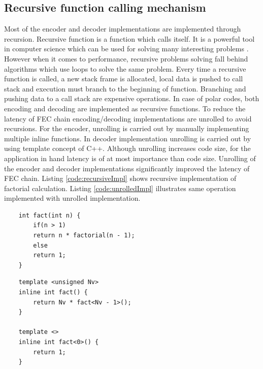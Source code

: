 \subsection{Recursive function calling mechanism}
Most of the encoder and decoder implementations are implemented through recursion. Recursive function is a function which calls itself. It is a powerful tool in computer science which can be used for solving many interesting problems \cite{CLRS}. However when it comes to performance, recursive problems solving fall behind algorithms which use loops to solve the same problem. Every time a recursive function is called, a new stack frame is allocated, local data is pushed to call stack and execution must branch to the beginning of function. Branching and pushing data to a call stack are expensive operations. In case of polar codes, both encoding and decoding are implemented as recursive functions. To reduce the latency of FEC chain encoding/decoding implementations are unrolled to avoid recursions. For the encoder, unrolling is carried out by manually implementing multiple inline functions. In decoder implementation unrolling is carried out by using template concept of C++. Although unrolling increases code size, for the application in hand latency is of at most importance than code size. Unrolling of the encoder and decoder implementations significantly improved the latency of FEC chain. Listing \ref{code:recursiveImpl} shows recursive implementation of factorial calculation. Listing \ref{code:unrolledImpl} illustrates same operation implemented with unrolled implementation. 

\begin{code}
	\label{code:recursiveImpl}
	\begin{verbatim}
	int fact(int n) {
		if(n > 1)
		return n * factorial(n - 1);
		else
		return 1;
	}
	\end{verbatim}
\end{code}

\begin{code}
	\label{code:unrolledImpl}
	\begin{verbatim}
	template <unsigned Nv>
	inline int fact() {
		return Nv * fact<Nv - 1>();
	}
	
	template <>
	inline int fact<0>() {
		return 1;
	}	
	\end{verbatim}
\end{code}